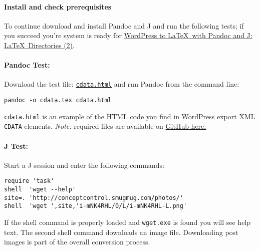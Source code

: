 \paragraph{Install and check prerequisites}

To continue download and install Pandoc and J and run the following
tests; if you succeed you're system is ready for
\href{http://bakerjd99.wordpress.com/2012/02/18/wordpress-to-latex-with-pandoc-and-j-latex-directories-part-2-2/}{WordPress
to \LaTeX\ with Pandoc and J: \LaTeX\ Directories (2)}.

\paragraph{Pandoc Test:} Download the test file: \href{https://github.com/bakerjd99/jacks/blob/master/texfrwpxml/cdata.html}{\texttt{cdata.html}} and run Pandoc from the
command line:

\begin{tcolorbox}[breakable, size=fbox, boxrule=1pt, pad at break*=1mm,colback=cellbackground, colframe=cellborder]
\begin{verbatim}
pandoc -o cdata.tex cdata.html
\end{verbatim}
\end{tcolorbox}

\noindent \texttt{cdata.html} is an example of the HTML code you find in WordPress
export XML \texttt{CDATA} elements. \emph{Note:} required files are 
available on \href{https://github.com/bakerjd99/jacks/tree/master/texfrwpxml}{GitHub here.}

\paragraph{J Test:} Start a J session and enter the following commands:
\begin{tcolorbox}[breakable, size=fbox, boxrule=1pt, pad at break*=1mm,colback=cellbackground, colframe=cellborder]
\begin{lstlisting}[language=jdoc, frame=single,framerule=0pt,label=lst:scr2374x0]
require 'task'
shell  'wget --help'
site=. 'http://conceptcontrol.smugmug.com/photos/'
shell  'wget ',site,'i-mNK4RHL/0/L/i-mNK4RHL-L.png'
\end{lstlisting}
\end{tcolorbox}

\noindent If the shell command is properly loaded and \texttt{wget.exe} is found
you will see help text. The second shell command downloads an image
file. Downloading post images is part of the overall conversion process.

